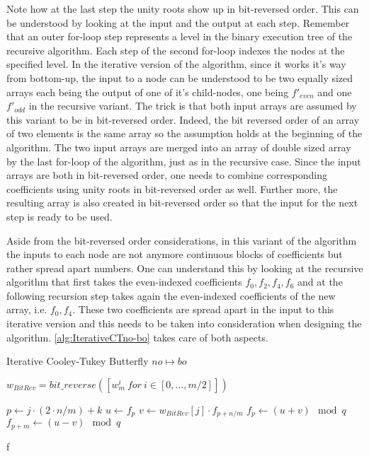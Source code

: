 Note how at the last step the unity roots show up in bit-reversed order. This can be understood by looking at the input and the output at each step. Remember that an outer for-loop step represents a level in the binary execution tree of the recursive algorithm. Each step of the second for-loop indexes the nodes at the specified level. In the iterative version of the algorithm, since it works it's way from bottom-up, the input to a node can be understood to be two equally sized arrays each being the output of one of it's child-nodes, one being $f'_{even}$ and one $f'_{odd}$ in the recursive variant. The trick is that both input arrays are assumed by this variant to be in bit-reversed order. Indeed, the bit reversed order of an array of two elements is the same array so the assumption holds at the beginning of the algorithm. The two input arrays are merged into an array of double sized array by the last for-loop of the algorithm, just as in the recursive case. Since the input arrays are both in bit-reversed order, one needs to combine corresponding coefficients using unity roots in bit-reversed order as well. Further more, the resulting array is also created in bit-reversed order so that the input for the next step is ready to be used.

Aside from the bit-reversed order considerations, in this variant of the algorithm the inputs to each node are not anymore continuous blocks of coefficients but rather spread apart numbers. One can understand this by looking at the recursive algorithm that first takes the even-indexed coefficients $f_0, f_2, f_4, f_6$ and at the following recursion step takes again the even-indexed coefficients of the new array, i.e. $f_0, f_4$. These two coefficients are spread apart in the input to this iterative version and this needs to be taken into consideration when designing the algorithm. \cref{alg:IterativeCTno-bo} takes care of both aspects.

\begin{algorithm}[h]
    \caption{Iterative Cooley-Tukey Butterfly $no \mapsto bo$}
    \label{alg:IterativeCTno-bo}
    \begin{algorithmic}[1]

            \State $w_{BitRev} = bit\_reverse([w_m^i\ for\ i \in [0, \ldots, m / 2]])$

                    \State $p \leftarrow j \cdot (2 \cdot n/m) + k$
                    \State $u \leftarrow f_{p}$
                    \State $v \leftarrow w_{BitRev}[j] \cdot f_{p + n/m}$
                    \State $f_{p} \leftarrow (u + v) \mod q$
                    \State $f_{p + m} \leftarrow (u - v) \mod q$
                \EndFor
            \EndFor
        \EndFor

        \Return f

    \EndProcedure

    \end{algorithmic}
\end{algorithm}


